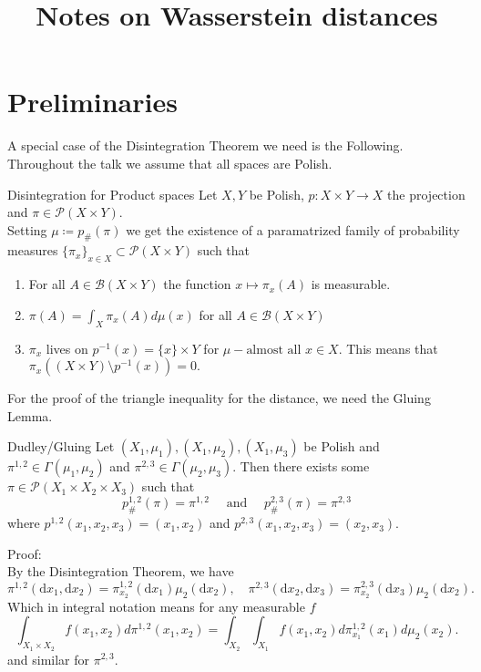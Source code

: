 \documentclass[15pt]{article}
\title{Notes on Wasserstein distances}
\author{ }
\date{}
\makeatletter
\newcommand{\mathleft}{\@fleqntrue\@mathmargin10pt}
\makeatother
\begin{document}
\maketitle

\newlength\breite
\setlength\breite{\linewidth-4pt}
\setlength\fboxsep{0pt}
\setlength\fboxrule{0.25pt}
\setlength{\abovedisplayskip}{3mm} %
\setlength{\belowdisplayskip}{3mm} %
\setlength\itemsep{0pt}
\setlength\parindent{0pt}


\mathleft

\section*{Preliminaries}

A special case of the Disintegration Theorem we need is the Following. 
Throughout the talk we assume that all spaces are Polish. 
\begin{theorem}{Disintegration for Product spaces}{}
Let $X,Y$ be Polish, $p : X \times Y \rightarrow X$ the projection and $\pi \in \mathcal{P}(X \times Y)$. \\ 
Setting $\mu \coloneqq p_{\#}(\pi)$ we get the existence of a paramatrized family of probability measures $\{\pi_x\}_{x \in X} \subset \mathcal{P}(X \times Y)$ such that
\begin{enumerate}
\item For all $A \in \mathcal{B}(X \times Y)$ the function $x \mapsto \pi_x(A)$ is measurable.
\item $\pi(A) = \int_X \pi_x(A) d\mu(x)$ for all $A \in \mathcal{B}(X \times Y)$
\item $\pi_x$ lives on $p^{-1}(x) = \{x\} \times Y$ for $\mu-\text{almost all } x \in X.$ This means that $\pi_x((X \times Y) \setminus p^{-1}(x)) = 0.$
\end{enumerate} 
\end{theorem}

For the proof of the triangle inequality for the distance, we need the Gluing Lemma. 
\begin{lemma}{Dudley/Gluing}{}
Let $(X_1,\mu_1), (X_1,\mu_2),(X_1,\mu_3)$ be Polish and $\pi^{1,2} \in \Gamma(\mu_1,\mu_2)$ and $\pi^{2,3} \in \Gamma(\mu_2,\mu_3)$. 
Then there exists some $\pi \in \mathcal{P}(X_1 \times X_2 \times X_3)$ such that $$p_{\#}^{1,2}(\pi) = \pi^{1,2} \quad \text{ and } \quad p_{\#}^{2,3}(\pi) = \pi^{2,3}$$ where $p^{1,2}(x_1,x_2,x_3) = (x_1,x_2)$ and $p^{2,3}(x_1,x_2,x_3) = (x_2,x_3).$ 
\end{lemma}
Proof: 
\vspace{0.3cm} \\
By the Disintegration Theorem, we have $$\pi^{1,2}(\mathrm{d}x_1,\mathrm{d}x_2)=\pi_{x_2}^{1,2}(\mathrm{d}x_1)\mu_2(\mathrm{d}x_2),\quad\pi^{2,3}(\mathrm{d}x_2,\mathrm{d}x_3)=\pi_{x_2}^{2,3}(\mathrm{d}x_3)\mu_2(\mathrm{d}x_2).$$ 
Which in integral notation means for any measurable $f$ $$\int_{X_1 \times X_2} f(x_1,x_2) d\pi^{1,2}(x_1,x_2) = \int_{X_2} \int_{X_1} f(x_1,x_2) d\pi_{x_1}^{1,2}(x_1) d\mu_2(x_2).$$ and similar for $\pi^{2,3}$.
\end{document}
